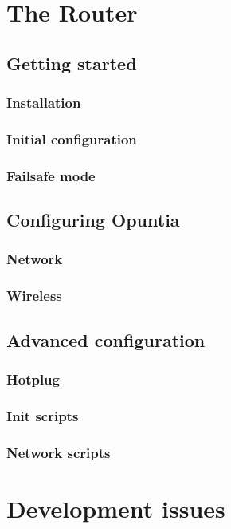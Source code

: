\documentclass[a4paper]{book}
\begin{document}
\tableofcontents
\chapter{The Router}
  \section{Getting started}
    \subsection{Installation}
    \subsection{Initial configuration}
    \subsection{Failsafe mode}
  \section{Configuring Opuntia}
    \subsection{Network}
      
    \subsection{Wireless}
      
  \section{Advanced configuration}
    
    \subsection{Hotplug}
    \subsection{Init scripts}
      
    \subsection{Network scripts}
      
\chapter{Development issues}
\end{document}
